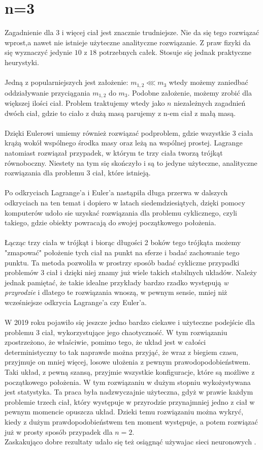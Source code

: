 \documentclass{article}
\begin{document}
\section{n=3}
Zagadnienie dla $3$ i więcej ciał jest znacznie trudniejsze. Nie da się tego rozwiązać wprost,a nawet nie istnieje użyteczne analityczne rozwiązanie. Z praw fizyki da się wyznaczyć jedynie $10$ z $18$ potrzebnych całek. Stosuje się jednak praktyczne heurystyki.\\\\
Jedną z popularniejszych jest założenie: $m_{1,2} \lll m_3$ wtedy możemy zaniedbać oddziaływanie przyciągania $m_{1,2}$ do $m_3$. Podobne założenie, możemy zrobić dla większej ilości ciał. Problem traktujemy wtedy jako $n$ niezależnych zagadnień dwóch ciał, gdzie to ciało z dużą masą parujemy z n-em ciał z małą masą.\\\\
Dzięki Eulerowi umiemy również rozwiązać podproblem, gdzie wszystkie 3 ciała krążą wokół wspólnego środka masy oraz leżą na wspólnej prostej. Lagrange natomiast rozwiązał przypadek, w którym te trzy ciała tworzą trójkąt równoboczny. Niestety na tym się skończyło i są to jedyne użyteczne, analityczne rozwiązania dla problemu 3 ciał, które istnieją.\\\\
Po odkryciach Lagrange'a i Euler'a nastąpiła długa przerwa w dalszych odkryciach na ten temat i dopiero w latach siedemdziesiątych, dzięki pomocy komputerów udoło sie uzyskać rozwiązania dla problemu cyklicznego, czyli takiego, gdzie obiekty powracają do swojej początkowego położenia.\\\\
Łącząc trzy ciała w trójkąt i biorąc długości 2 boków tego trójkąta możemy "zmapować" położenie tych ciał na punkt na sferze i badać zachowanie tego punktu. Ta metoda pozwoliła w prostrzy sposób badać cykliczne przypadki problemów 3 ciał i dzięki niej znamy już wiele takich stabilnych układów. Należy jednak pamiętać, że takie idealne przykłady bardzo rzadko występują \textit{w przyrodzie} i dlatego te rozwiązania wnoszą, w pewnym sensie, mniej niż wcześniejsze odkrycia Lagrange'a czy Euler'a.\\\\
W 2019 roku pojawiło się jeszcze jedno bardzo ciekawe i użyteczne podejście dla problemu 3 ciał\cite{chaotic}, wykorzystujące jego chaotyczność. W tym rozwiązaniu zpostrzeżono, że właściwie, pomimo tego, że układ jest w całości deterministyczny to tak naprawde można przyjąć, że wraz z biegiem czasu, przyjmuje on mniej więcej, losowe ułożenia z pewnym prawodopodobieństwem. Taki układ, z pewną szansą, przyjmie wszystkie konfiguracje, które są możliwe z początkowego położenia. W tym rozwiązaniu w dużym stopniu wykożystywana jest statystyka. Ta praca była nadzwyczajnie użyteczna, gdyż w prawie każdym problemie trzech ciał, który występuje w przyrodzie przynajmniej jedno z ciał w pewnym momencie opuszcza układ. Dzieki temu rozwiązaniu można wykryć, kiedy z dużym prawdopodobieństwem ten moment występuje, a potem rozwiązać już w prosty sposób przypadek dla $n=2$. \\Zaskakująco dobre rezultaty udało się też osiągnąć używajac sieci neuronowych \cite{chaotic-nn}.
\end{document}
